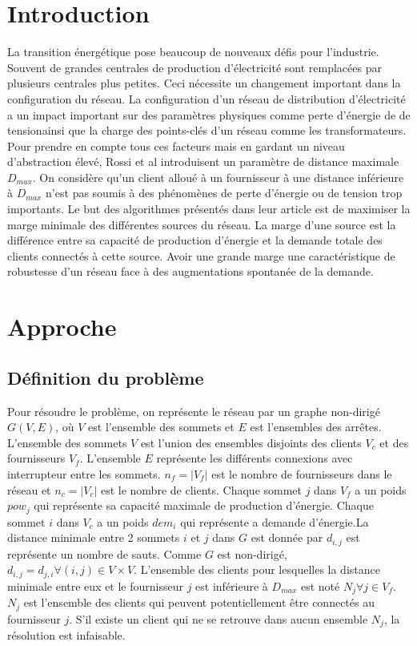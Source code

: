 \documentclass[12pt,a4paper]{article}
\begin{document}
\begin{multicols}{2}
\section{Introduction}
La transition énergétique pose beaucoup de nouveaux défis pour l'industrie. Souvent de grandes centrales de production d'électricité sont remplacées par plusieurs centrales plus petites. Ceci nécessite un changement important dans la configuration du réseau. La configuration d'un réseau de distribution d'électricité a un impact important sur des paramètres physiques comme perte d'énergie de de tensionainsi que la charge des points-clés d'un réseau comme les transformateurs. Pour prendre en compte tous ces facteurs mais en gardant un niveau d'abstraction élevé, Rossi et al \cite{Rossi} introduisent un paramètre de distance maximale $D_{max}$. On considère qu'un client alloué à un fournisseur à une distance inférieure à $D_{max}$ n'est pas soumis à des phénomènes de perte d'énergie ou de tension trop importants.\newline \indent
Le but des algorithmes présentés dans leur article est de maximiser la marge minimale des différentes sources du réseau. La marge d'une source est la différence entre sa capacité de production d'énergie et la demande totale des clients connectés à cette source.\newline \indent
Avoir une grande marge une caractéristique de robustesse d'un réseau face à des augmentations spontanée de la demande.
\section{Approche}
\subsection{Définition du problème}
Pour résoudre le problème, on représente le réseau par un graphe non-dirigé $G(V,E)$, où $V$ est l'ensemble des sommets et $E$ est l'ensembles des arrêtes. L'ensemble des sommets $V$ est l'union des ensembles disjoints des clients  $V_{c}$ et des fournisseurs $V_{f}$. L'ensemble $E$ représente les différents connexions avec interrupteur entre les sommets. $n_{f}=|V_{f}| $ est le nombre de fournisseurs dans le réseau et $n_{c}=|V_{c}| $ est le nombre de clients. Chaque sommet $j$ dans $V_{f}$ a un poids $pow_{j}$ qui représente sa capacité maximale de production d'énergie. Chaque sommet $i$ dans $V_{c}$ a un poids $dem_{i}$ qui représente a demande d'énergie.La distance minimale entre 2 sommets $i$ et $j$ dans $G$ est donnée par $d_{i,j}$ est représente un nombre de sauts. Comme $G$ est non-dirigé, $d_{i,j}=d_{j,i} \forall (i,j) \in V \times V$. L'ensemble des clients pour lesquelles la distance minimale entre eux et le fournisseur $j$ est inférieure à $D_{max}$ est noté $N_{j} \forall j \in V_{f}$. $N_{j}$ est l'ensemble des clients qui peuvent potentiellement être connectés au fournisseur $j$. S'il existe un client qui ne se retrouve dans aucun ensemble $N_{j}$, la résolution est infaisable.

\end{multicols}
\end{document}
